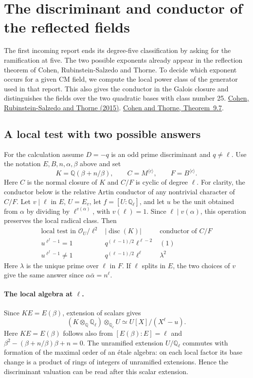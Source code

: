\section{The discriminant and conductor of the reflected fields}
\label{sec:local}
The first incoming report ends its degree-five classification by asking for the ramification at five. The two possible exponents already appear in the reflection theorem of Cohen, Rubinstein-Salzedo and Thorne. To decide which exponent occurs for a given CM field, we compute the local power class of the generator used in that report. This also gives the conductor in the Galois closure and distinguishes the fields over the two quadratic bases with class number 25.
\href{https://doi.org/10.1112/S0010437X15007411}{Cohen, Rubinstein-Salzedo and Thorne (2015)}.
\href{https://thornef.github.io/countDLgen-final.pdf}{Cohen and Thorne, Theorem~9.7}.



\subsection{A local test with two possible answers}
For the calculation assume $D=-q$ is an odd prime discriminant and $q\ne\ell$. Use the notation $E,B,n,\alpha,\beta$ above and set
\[
 K=\mathbb Q(\beta+n/\beta),\qquad C=M^{\langle c\rangle},\qquad F=B^{\langle c\rangle}.
\]
Here $C$ is the normal closure of $K$ and $C/F$ is cyclic of degree $\ell$. For clarity, the conductor below is the relative Artin conductor of any nontrivial character of $C/F$. Let $v\mid\ell$ in $E$, $U=E_v$, let $f=[U:\mathbb Q_\ell]$, and let $u$ be the unit obtained from $\alpha$ by dividing by $\ell^{v(\alpha)}$, with $v(\ell)=1$. Since $\ell\mid v(\alpha)$, this operation preserves the local radical class. Then
\[
 \begin{array}{c|c|c}
  \text{local test in }\mathcal O_U/\ell^2&
  |\operatorname{disc}(K)| & \text{conductor of } C/F\\ \hline
  u^{\ell^f-1}=1 & q^{(\ell-1)/2}\ell^{\ell-2} & (1) \\
  u^{\ell^f-1}\ne1 & q^{(\ell-1)/2}\ell^{\ell} & \lambda^2
 \end{array}
\]
Here $\lambda$ is the unique prime over $\ell$ in $F$. If $\ell$ splits in $E$, the two choices of $v$ give the same answer since $\alpha\bar\alpha=n^\ell$.

\paragraph{The local algebra at $\ell$.}
Since $K E=E(\beta)$, extension of scalars gives
\[
 (K\otimes_{\mathbb Q}\mathbb Q_\ell)\otimes_{\mathbb Q_\ell}U
       \simeq U[X]/(X^\ell-u).
\]
Here $KE=E(\beta)$ follows also from $[E(\beta):E]=\ell$ and $\beta^2-(\beta+n/\beta)\beta+n=0$. The unramified extension $U/\mathbb Q_\ell$ commutes with formation of the maximal order of an \'etale algebra: on each local factor its base change is a product of rings of integers of unramified extensions. Hence the discriminant valuation can be read after this scalar extension.

